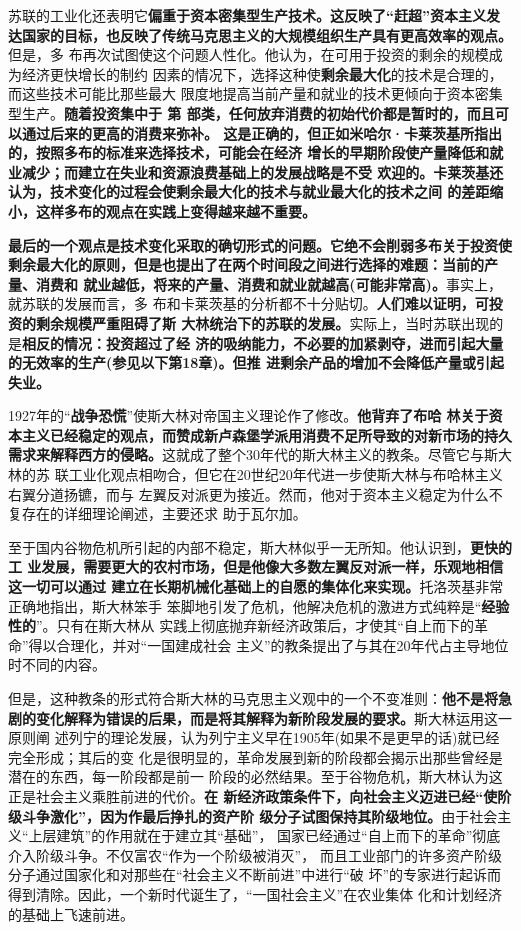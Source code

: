 苏联的工业化还表明它\textbf{偏重于资本密集型生产技术。这反映了“赶超”资本主义发
  达国家的目标，也反映了传统马克思主义的大规模组织生产具有更高效率的观点。}但是，多
布再次试图使这个问题人性化。他认为，在可用于投资的剩余的规模成为经济更快增长的制约
因素的情况下，选择这种使\textbf{剩余最大化}的技术是合理的，而这些技术可能比那些最大
限度地提高当前产量和就业的技术更倾向于资本密集型生产。\textbf{随着投资集中于
  第 部类，任何放弃消费的初始代价都是暂时的，而且可以通过后来的更高的消费来弥补。
  这是正确的，但正如米哈尔·卡莱茨基所指出的，按照多布的标准来选择技术，可能会在经济
  增长的早期阶段使产量降低和就业减少；而建立在失业和资源浪费基础上的发展战略是不受
  欢迎的。卡莱茨基还认为，技术变化的过程会使剩余最大化的技术与就业最大化的技术之间
  的差距缩小，这样多布的观点在实践上变得越来越不重要。}

\textbf{最后的一个观点是技术变化采取的确切形式的问题。它绝不会削弱多布关于投资使
  剩余最大化的原则，但是也提出了在两个时间段之间进行选择的难题：当前的产量、消费和
  就业越低，将来的产量、消费和就业就越高(可能非常高)。}事实上，就苏联的发展而言，多
布和卡莱茨基的分析都不十分贴切。\textbf{人们难以证明，可投资的剩余规模严重阻碍了斯
  大林统治下的苏联的发展。}实际上，当时苏联出现的是\textbf{相反的情况：投资超过了经
  济的吸纳能力，不必要的加紧剥夺，进而引起大量的无效率的生产(参见以下第18章)。但推
  进剩余产品的增加不会降低产量或引起失业。}

1927年的“\textbf{战争恐慌}”使斯大林对帝国主义理论作了修改。\textbf{他背弃了布哈
  林关于资本主义已经稳定的观点，而赞成新卢森堡学派用消费不足所导致的对新市场的持久
  需求来解释西方的侵略。}这就成了整个30年代的斯大林主义的教条。尽管它与斯大林的苏
联工业化观点相吻合，但它在20世纪20年代进一步使斯大林与布哈林主义右翼分道扬镳，而与
左翼反对派更为接近。然而，他对于资本主义稳定为什么不复存在的详细理论阐述，主要还求
助于瓦尔加。

至于国内谷物危机所引起的内部不稳定，斯大林似乎一无所知。他认识到，\textbf{更快的工
  业发展，需要更大的农村市场，但是他像大多数左翼反对派一样，乐观地相信这一切可以通过
  建立在长期机械化基础上的自愿的集体化来实现。}托洛茨基非常正确地指出，斯大林笨手
笨脚地引发了危机，他解决危机的激进方式纯粹是“\textbf{经验性的}”。只有在斯大林从
实践上彻底抛弃新经济政策后，才使其“自上而下的革命”得以合理化，并对“一国建成社会
主义”的教条提出了与其在20年代占主导地位时不同的内容。

但是，这种教条的形式符合斯大林的马克思主义观中的一个不变准则：\textbf{他不是将急
  剧的变化解释为错误的后果，而是将其解释为新阶段发展的要求。}斯大林运用这一原则阐
述列宁的理论发展，认为列宁主义早在1905年(如果不是更早的话)就已经完全形成；其后的变
化是很明显的，革命发展到新的阶段都会揭示出那些曾经是潜在的东西，每一阶段都是前一
阶段的必然结果。至于谷物危机，斯大林认为这正是社会主义乘胜前进的代价。\textbf{在
  新经济政策条件下，向社会主义迈进已经“使阶级斗争激化”，因为作最后挣扎的资产阶
  级分子试图保持其阶级地位。}由于社会主义“上层建筑”的作用就在于建立其“基础”，
国家已经通过“自上而下的革命”彻底介入阶级斗争。不仅富农“作为一个阶级被消灭”，
而且工业部门的许多资产阶级分子通过国家化和对那些在“社会主义不断前进”中进行“破
坏”的专家进行起诉而得到清除。因此，一个新时代诞生了，“一国社会主义”在农业集体
化和计划经济的基础上飞速前进。


